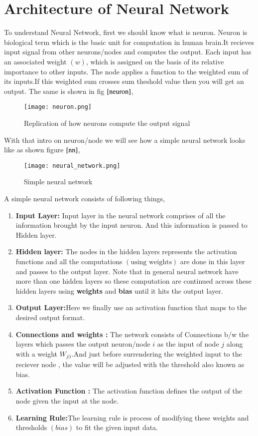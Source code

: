 \documentclass[journal,12pt,onecolumn]{IEEEtran}
\providecommand{\brak}[1]{\ensuremath{\left(#1\right)}}
\theoremstyle{remark}
\numberwithin{equation}{section}
\begin{document}
                \section{Architecture of Neural Network}
                    To understand Neural Network, first we should know what is neuron. Neuron is biological term which is the basic unit for computation in human brain.It recieves input signal from other neurons/nodes and computes the output. Each input has an associated weight $\brak{w}$, which is assigned on the basis of its relative importance to other inputs. The node applies a function to the weighted sum of its inputs.If this weighted sum crosses sum theshold value then you will get an output.
The same is shown in fig $\ref{neuron}$,
                \begin{figure}
                  \centering
                  \texttt{[image: neuron.png]}
                  \caption{Replication of how neurons compute the output signal}
                  \label{neuron}
                \end{figure}
 With that intro on neuron/node we will see how a simple neural network looks like as shown figure $\ref{nn}$,
                  \begin{figure}
                   \centering
                   \texttt{[image: neural\_network.png]}
                   \caption{Simple neural network}
                   \label{nn}
                  \end{figure}
           A simple neural network consists of following things,
              \begin{enumerate}
                 \item \textbf{Input Layer:} Input layer in the neural network comprises of all the information brought by the input neuron. And this information is passed to Hidden layer.
                 \item \textbf{Hidden layer:} The nodes in the hidden layers represents the activation functions and all the computations $\brak{\text{using weights}}$ are done in this layer and passes to the output layer. Note that in general neural network have more than one hidden layers so these computation are continued across these hidden layers using \textbf{weights} and \textbf{bias} until it hits the output layer.
                 \item \textbf{Output Layer:}Here we finally use an activation function that maps to the desired output format.
                 \item \textbf{Connections and weights :} The network consists of Connections b/w the layers which passes the output neuron/node $i$ as the input of  node $j$ along with a weight $W_{j|i}$.And just before surrendering the weighted input to the reciever node , the value will be adjusted with the threshold also known as bias. 
                 \item \textbf{Activation Function :} The activation function defines the output of the node given the input at the node.
                 \item \textbf{Learning Rule:}The learning rule is process of modifying these weights and thresholds $\brak{bias}$ to fit the given input data.
               \end{enumerate}
\end{document}
